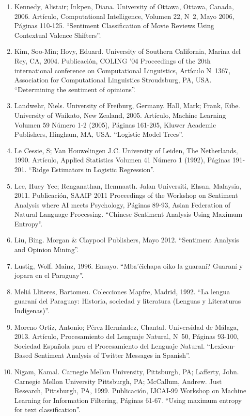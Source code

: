 \begin{enumerate}
\item Kennedy, Alistair; Inkpen, Diana. University of Ottawa, Ottawa, Canada, 2006. Art\'iculo, Computational Intelligence, Volumen 22, N\grado\ 2, Mayo 2006, P\'aginas 110-125. ``Sentiment Classification of Movie Reviews Using Contextual Valence Shifters''.
\item Kim, Soo-Min; Hovy, Eduard. University of Southern California, Marina del Rey, CA, 2004. Publicaci\'on, COLING '04 Proceedings of the 20th international conference on Computational Linguistics, Art\'iculo N\grado \ 1367, Association for Computational Linguistics Stroudsburg, PA, USA. ``Determining the sentiment of opinions''.
\item Landwehr, Niels. University of Freiburg, Germany. Hall, Mark; Frank, Eibe. University of Waikato, New Zealand, 2005. Art\'iculo, Machine Learning Volumen 59 N\'umero 1-2 (2005), P\'aginas 161-205, Kluwer Academic Publishers, Hingham, MA, USA. ``Logistic Model Trees''.
\item Le Cessie, S; Van Houwelingen J.C. University of Leiden, The Netherlands, 1990. Art\'iculo, Applied Statistics Volumen 41 N\'umero 1 (1992), P\'aginas 191-201. ``Ridge Estimators in Logistic Regression''.
\item Lee, Huey Yee; Renganathan, Hemnaath. Jalan Universiti, Ehsan, Malaysia, 2011. Publicaci\'on, SAAIP 2011 Proceedings of the Workshop on Sentiment Analysis where AI meets Psychology, P\'aginas 89-93, Asian Federation of Natural Language Processing. ``Chinese Sentiment Analysis Using Maximum Entropy''.
\item Liu, Bing. Morgan \& Claypool Publishers, Mayo 2012. ``Sentiment Analysis and Opinion Mining''.
\item Lustig, Wolf. Mainz, 1996. Ensayo. ``Mba'\'eichapa oiko la guarani? Guaran\'i y jopara en el Paraguay''.
\item Meli\'a Lliteres, Bartomeu. Colecciones Mapfre, Madrid, 1992. ``La lengua guaran\'i del Paraguay: Historia, sociedad y literatura (Lenguas y Literaturas Ind\'igenas)''.
\item Moreno-Ortiz, Antonio; P\'erez-Hern\'andez, Chantal. Universidad de M\'alaga, 2013. Art\'iculo, Procesamiento del Lenguaje Natural, N\grado\ 50, P\'aginas 93-100, Sociedad Espa\~nola para el Procesamiento del Lenguaje Natural. ``Lexicon-Based Sentiment Analysis of Twitter Messages in Spanish''.
\item Nigam, Kamal. Carnegie Mellon University, Pittsburgh, PA; Lafferty, John. Carnegie Mellon University Pittsburgh, PA; McCallum, Andrew. Just Research, Pittsburgh, PA, 1999. Publicaci\'on, IJCAI-99 Workshop on Machine Learning for Information Filtering, P\'aginas 61-67. ``Using maximum entropy for text classification''.

\end{enumerate}

